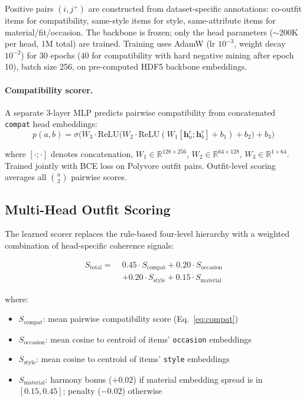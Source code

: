 \documentclass[10pt,twocolumn]{article}
\begin{document}
\noindent Positive pairs $(i, j^+)$ are constructed from dataset-specific
annotations: co-outfit items for compatibility, same-style items for
style, same-attribute items for material/fit/occasion.  The backbone is
frozen; only the head parameters ($\sim$200K per head, 1M total) are
trained.  Training uses AdamW (lr $10^{-3}$, weight decay $10^{-2}$) for
30 epochs (40 for compatibility with hard negative mining after epoch 10),
batch size 256, on pre-computed HDF5 backbone embeddings.

\paragraph{Compatibility scorer.}
A separate 3-layer MLP predicts pairwise compatibility from concatenated
\texttt{compat} head embeddings:
\begin{equation}
  p(a, b) = \sigma\Big(
    W_3 \cdot \text{ReLU}\big(
      W_2 \cdot \text{ReLU}(W_1 [\mathbf{h}_a^c ; \mathbf{h}_b^c] + b_1) + b_2
    \big) + b_3
  \Big)
\label{eq:compat}
\end{equation}

\noindent where $[\cdot;\cdot]$ denotes concatenation,
$W_1 \in \mathbb{R}^{128 \times 256}$, $W_2 \in \mathbb{R}^{64 \times 128}$,
$W_3 \in \mathbb{R}^{1 \times 64}$.  Trained jointly with BCE loss on
Polyvore outfit pairs.  Outfit-level scoring averages all
$\binom{n}{2}$ pairwise scores.

\subsection{Multi-Head Outfit Scoring}
\label{sec:mh_scoring}

The learned scorer replaces the rule-based four-level hierarchy with a
weighted combination of head-specific coherence signals:

\begin{align}
  S_{\text{total}} = \;&0.45 \cdot S_{\text{compat}} + 0.20 \cdot S_{\text{occasion}} \nonumber\\
                       &+ 0.20 \cdot S_{\text{style}} + 0.15 \cdot S_{\text{material}}
\label{eq:mh_score}
\end{align}

\noindent where:
\begin{itemize}[leftmargin=*,topsep=0pt,itemsep=1pt]
\item $S_{\text{compat}}$: mean pairwise compatibility score
  (Eq.~\ref{eq:compat})
\item $S_{\text{occasion}}$: mean cosine to centroid of items'
  \texttt{occasion} embeddings
\item $S_{\text{style}}$: mean cosine to centroid of items'
  \texttt{style} embeddings
\item $S_{\text{material}}$: harmony bonus ($+0.02$) if material
  embedding spread is in $[0.15, 0.45]$; penalty ($-0.02$) otherwise
\end{itemize}
\end{document}
